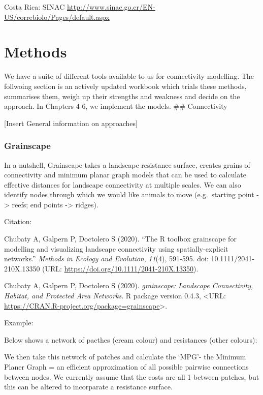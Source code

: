 \documentclass[
]{book}
\begin{document}
Costa Rica: SINAC \url{http://www.sinac.go.cr/EN-US/correbiolo/Pages/default.aspx}

\hypertarget{methods}{%
\chapter{Methods}\label{methods}}

We have a suite of different tools available to us for connectivity modelling. The follwoing section is an actively updated workbook which trials these methods, summarises them, weigh up their strengths and weakness and decide on the approach. In Chapters 4-6, we implement the models.
\#\# Connectivity

{[}Insert General information on approaches{]}

\hypertarget{grainscape}{%
\subsection{Grainscape}\label{grainscape}}

In a nutshell, Grainscape takes a landscape resistance surface, creates grains of connectivity and minimum planar graph models that can be used to calculate effective distances for landscape connectivity at multiple scales. We can also identify nodes through which we would like animals to move (e.g.~starting point -\textgreater{} reefs; end points -\textgreater{} ridges).

Citation:

Chubaty A, Galpern P, Doctolero S (2020). ``The R toolbox grainscape for modelling and visualizing landscape
connectivity using spatially-explicit networks.'' \emph{Methods in Ecology and Evolution}, \emph{11}(4), 591-595. doi:
10.1111/2041-210X.13350 (URL: \url{https://doi.org/10.1111/2041-210X.13350}).

Chubaty A, Galpern P, Doctolero S (2020). \emph{grainscape: Landscape Connectivity, Habitat, and Protected Area
Networks}. R package version 0.4.3, \textless URL: \url{https://CRAN.R-project.org/package=grainscape}\textgreater.

Example:

Below shows a network of pacthes (cream colour) and resistances (other colours):

We then take this network of patches and calculate the `MPG'- the Minimum Planer Graph = an efficient approximation of all possible pairwise connections between nodes. We currently assume that the costs are all 1 between patches, but this can be altered to incorparate a resistance surface.
\end{document}
